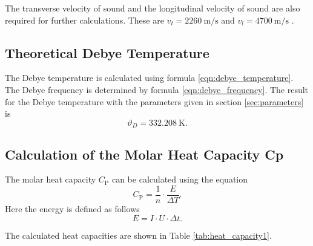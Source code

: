 The transverse velocity of sound and the longitudinal velocity of sound are also required for further calculations.
These are $v_t = \qty{2260}{\meter \per \second}$ and $v_l = \qty{4700}{\meter \per \second}$ \cite{molar_heat}.

\subsection{Theoretical Debye Temperature}
\label{sec:theoretical_debye_temperature}

The Debye temperature is calculated using formula \ref{eqn:debye_temperature}.
The Debye frequency is determined by formula \ref{eqn:debye_frequency}.
The result for the Debye temperature with the parameters given in section \ref{sec:parameters} is
\begin{equation*}
	\vartheta_D = \qty{332.208}{\kelvin}.
\end{equation*}


\subsection{Calculation of the Molar Heat Capacity Cp}
\label{sec:calculation_of_the_molar_heat_capacity_cp}

The molar heat capacity $C_{\text{P}}$ can be calculated using the equation
\begin{equation}
	C_{\text{P}} = \frac{1}{n} \cdot \frac{E}{\Delta T}.
\end{equation}
Here the energy is defined as follows
\begin{equation}
	E = I \cdot U \cdot \Delta t.
\end{equation}

The calculated heat capacities are shown in Table \ref{tab:heat_capacity1}.

